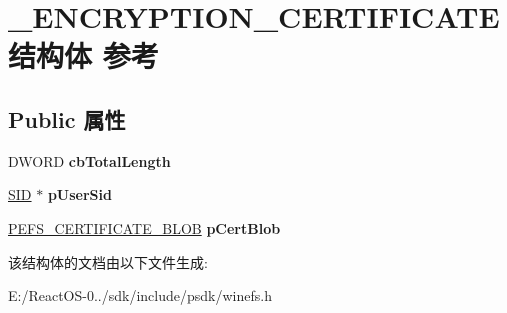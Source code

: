 \hypertarget{struct___e_n_c_r_y_p_t_i_o_n___c_e_r_t_i_f_i_c_a_t_e}{}\section{\+\_\+\+E\+N\+C\+R\+Y\+P\+T\+I\+O\+N\+\_\+\+C\+E\+R\+T\+I\+F\+I\+C\+A\+T\+E结构体 参考}
\label{struct___e_n_c_r_y_p_t_i_o_n___c_e_r_t_i_f_i_c_a_t_e}
\subsection*{Public 属性}
\begin{DoxyCompactItemize}
\item 
\mbox{\label{struct___e_n_c_r_y_p_t_i_o_n___c_e_r_t_i_f_i_c_a_t_e_a5729269a5cca92da4e3515ef9a967804}} 
D\+W\+O\+RD {\bfseries cb\+Total\+Length}
\item 
\mbox{\label{struct___e_n_c_r_y_p_t_i_o_n___c_e_r_t_i_f_i_c_a_t_e_a9411babcd4acbbbc3ccdfc987bec7c8b}} 
\hyperlink{struct___s_i_d}{S\+ID} $\ast$ {\bfseries p\+User\+Sid}
\item 
\mbox{\label{struct___e_n_c_r_y_p_t_i_o_n___c_e_r_t_i_f_i_c_a_t_e_acd6d2f17d43daa19f23419c0c8a0443b}} 
\hyperlink{struct___c_e_r_t_i_f_i_c_a_t_e___b_l_o_b}{P\+E\+F\+S\+\_\+\+C\+E\+R\+T\+I\+F\+I\+C\+A\+T\+E\+\_\+\+B\+L\+OB} {\bfseries p\+Cert\+Blob}
\end{DoxyCompactItemize}


该结构体的文档由以下文件生成\+:\begin{DoxyCompactItemize}
\item 
E\+:/\+React\+O\+S-\/0../sdk/include/psdk/winefs.\+h\end{DoxyCompactItemize}
